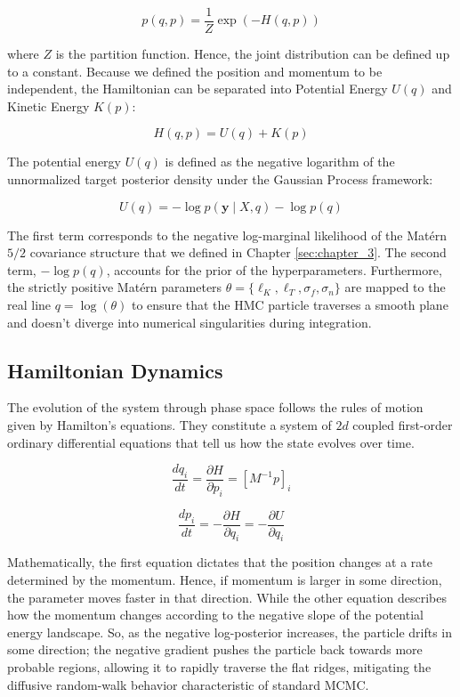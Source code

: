 \documentclass[12pt,oneside]{report}
\theoremstyle{definition}
\theoremstyle{remark}
\begin{document}
$$p(q, p) = \frac{1}{Z} \exp(-H(q, p))$$

where $Z$ is the partition function. Hence, the joint distribution can be defined up to a constant. Because we defined the position and momentum to be independent, the Hamiltonian can be separated into Potential Energy $U(q)$ and Kinetic Energy $K(p)$:

$$H(q, p) = U(q) + K(p)$$

The potential energy $U(q)$ is defined as the negative logarithm of the unnormalized target posterior density under the Gaussian Process framework:

$$U(q) = -\log p(\mathbf{y} \mid X, q) - \log p(q)$$

The first term corresponds to the negative log-marginal likelihood of the Matérn $5/2$ covariance structure that we defined in Chapter \ref{sec:chapter_3}. The second term, $-\log p(q)$, accounts for the prior of the hyperparameters. Furthermore, the strictly positive Matérn parameters $\theta = \{\ell_K, \ell_T, \sigma_f, \sigma_n\}$ are mapped to the real line $q = \log(\theta)$ to ensure that the HMC particle traverses a smooth plane and doesn't diverge into numerical singularities during integration.

\subsection{Hamiltonian Dynamics}
The evolution of the system through phase space follows the rules of motion given by Hamilton's equations. They constitute a system of $2d$ coupled first-order ordinary differential equations that tell us how the state evolves over time.


$$\frac{dq_i}{dt} = \frac{\partial H}{\partial p_i} = [M^{-1} p]_i$$

$$\frac{dp_i}{dt} = -\frac{\partial H}{\partial q_i} = -\frac{\partial U}{\partial q_i}$$

Mathematically, the first equation dictates that the position changes at a rate determined by the momentum. Hence, if momentum is larger in some direction, the parameter moves faster in that direction. While the other equation describes how the momentum changes according to the negative slope of the potential energy landscape. So, as the negative log-posterior increases, the particle drifts in some direction; the negative gradient pushes the particle back towards more probable regions, allowing it to rapidly traverse the flat ridges, mitigating the diffusive random-walk behavior characteristic of standard MCMC.
\end{document}
